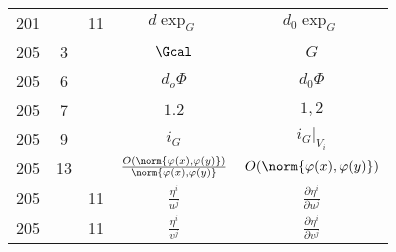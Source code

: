 \documentclass[a4paper,11pt]{article}
\numberwithin{equation}{section}
\begin{document}
\begin{center}
\begin{tabular}{|c|c|c|c|c|}
    201 & & 11 & $d \exp_{ G }$ & $d_{ 0 } \exp_{ G }$ \\
    205 & \hphantom{0}3 & & $\Gcal$ & $G$ \\
    205 & \hphantom{0}6 & & $d_{ o }\Phi$ & $d_{ 0 }\Phi$ \\
    205 & \hphantom{0}7 & & $1.2$ & $1, 2$ \\
    205 & \hphantom{0}9 & & $i_{ G }$ & $i_{ G }|_{ V_{ i } }$ \\[0.2em]
    205 & 13 & & $\frac{ O( \norm{ \varphi( x ), \varphi( y ) } ) }
                 { \norm{ \varphi( x ), \varphi( y ) } }$
           & $O( \norm{ \varphi( x ), \varphi( y ) } )$ \\[0.5em]
    205 & & 11 & $\frac{ \eta^{ i } }{ u^{ j } }$
           & $\frac{ \partial \eta^{ i } }{ \partial u^{ j } }$ \\[0.5em]
    205 & & 11 & $\frac{ \eta^{ i } }{ v^{ j } }$
           & $\frac{ \partial \eta^{ i } }{ \partial v^{ j } }$ \\[0.3em]
    \hline
  \end{tabular}





  \newpage


\end{center}
\end{document}
